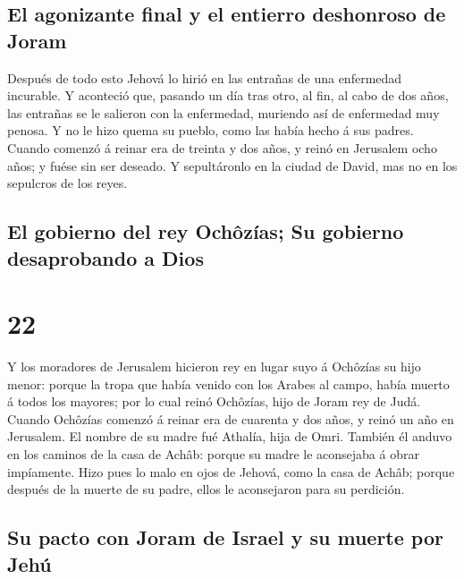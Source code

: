 \hypertarget{el-agonizante-final-y-el-entierro-deshonroso-de-joram}{%
\subsection{El agonizante final y el entierro deshonroso de
Joram}\label{el-agonizante-final-y-el-entierro-deshonroso-de-joram}}

 Después de todo esto Jehová lo hirió en las entrañas de
una enfermedad incurable.  Y aconteció que, pasando un día
tras otro, al fin, al cabo de dos años, las entrañas se le salieron con
la enfermedad, muriendo así de enfermedad muy penosa. Y no le hizo quema
su pueblo, como las había hecho á sus padres.  Cuando
comenzó á reinar era de treinta y dos años, y reinó en Jerusalem ocho
años; y fuése sin ser deseado. Y sepultáronlo en la ciudad de David, mas
no en los sepulcros de los reyes.

\hypertarget{el-gobierno-del-rey-ochuxf4zuxedas-su-gobierno-desaprobando-a-dios}{%
\subsection{El gobierno del rey Ochôzías; Su gobierno desaprobando a
Dios}\label{el-gobierno-del-rey-ochuxf4zuxedas-su-gobierno-desaprobando-a-dios}}

\hypertarget{section-21}{%
\section{22}\label{section-21}}

 Y los moradores de Jerusalem hicieron rey en lugar suyo á
Ochôzías su hijo menor: porque la tropa que había venido con los Arabes
al campo, había muerto á todos los mayores; por lo cual reinó Ochôzías,
hijo de Joram rey de Judá.  Cuando Ochôzías comenzó á reinar
era de cuarenta y dos años, y reinó un año en Jerusalem. El nombre de su
madre fué Athalía, hija de Omri.  También él anduvo en los
caminos de la casa de Achâb: porque su madre le aconsejaba á obrar
impíamente.  Hizo pues lo malo en ojos de Jehová, como la
casa de Achâb; porque después de la muerte de su padre, ellos le
aconsejaron para su perdición.

\hypertarget{su-pacto-con-joram-de-israel-y-su-muerte-por-jehuxfa}{%
\subsection{Su pacto con Joram de Israel y su muerte por
Jehú}\label{su-pacto-con-joram-de-israel-y-su-muerte-por-jehuxfa}}

